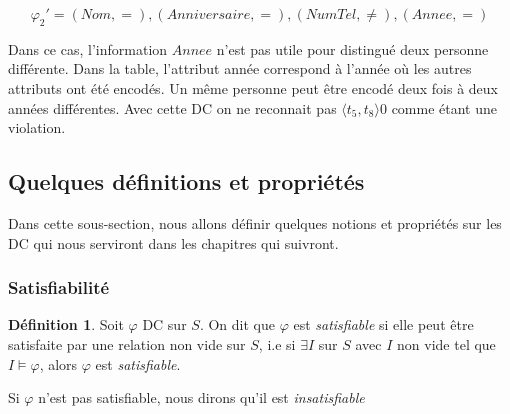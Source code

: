 \documentclass[letterpaper, 12pt]{report}
\theoremstyle{definition}
\newtheorem{mydef}{Définition}
\begin{document}
$$\varphi_2' = (Nom,=),(Anniversaire,=),(NumTel,\neq),(Annee,=) $$

Dans ce cas, l'information $Annee$ n'est pas utile pour distingué deux personne différente. Dans la table, l'attribut année correspond à l'année où les autres attributs ont été encodés. Un même personne peut être encodé deux fois à deux années différentes. Avec cette DC on ne reconnait pas $\langle t_5,t_8 \rangle0$ comme étant une violation.


\subsection{Quelques définitions et propriétés}

Dans cette sous-section, nous allons définir quelques notions et propriétés sur les DC qui nous serviront dans les chapitres qui suivront.
\subsubsection{Satisfiabilité}

\begin{mydef}
Soit $\varphi$ DC sur $S$. On dit que $\varphi$ est \emph{satisfiable} si elle peut être satisfaite par une relation non vide sur $S$, i.e si $\exists I$ sur $S$ avec $I$ non vide tel que $I \models \varphi$, alors $\varphi$ est \emph{satisfiable}.

Si $\varphi$ n'est pas satisfiable, nous dirons qu'il est \emph{insatisfiable} 
\end{mydef}
\end{document}
